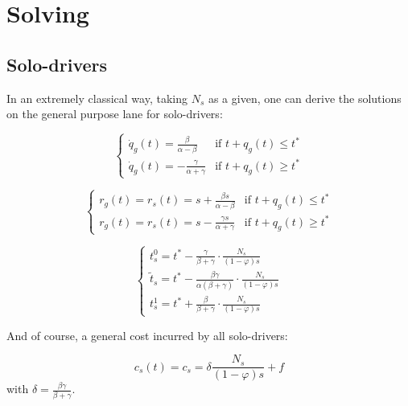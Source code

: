 \documentclass[english, a4paper]{article}
\theoremstyle{plain}
\begin{document}
\section{Solving}

\subsection{Solo-drivers}

In an extremely classical way, taking $N_s$ as a given, one can derive the solutions on the general purpose lane for solo-drivers:


\begin{equation}
    \left\{
    \begin{array}{lr}
        \dot{q}_g(t) = \frac{\beta}{\alpha - \beta} & \text{if } t+q_g(t) \leq t^*\\
        \dot{q}_g(t) = -\frac{\gamma}{\alpha + \gamma} & \text{if } t+q_g(t) \geq t^*  
    \end{array}
    \right.
\end{equation}

\begin{equation}
    \left\{
    \begin{array}{lr}
        r_g (t) = r_s(t) =s + \frac{\beta s}{\alpha - \beta} & \text{if } t+q_g(t) \leq t^*\\
        r_g (t) = r_s(t) =s - \frac{\gamma s}{\alpha + \gamma} & \text{if } t+q_g(t) \geq t^* 
    \end{array}
    \right.
\end{equation}

\begin{equation}
    \left\{
    \begin{array}{l}
        t_s^0 = t^* - \frac{\gamma}{\beta + \gamma} \cdot \frac{N_s}{(1-\varphi)s}\\
        \tilde{t}_s = t^* - \frac{\beta \gamma}{\alpha(\beta + \gamma)}\cdot \frac{N_s}{(1-\varphi)s}\\
        t_s^1 = t^* + \frac{\beta}{\beta + \gamma} \cdot \frac{N_s}{(1-\varphi)s}
    \end{array}
    \right.
\end{equation}

And of course, a general cost incurred by all solo-drivers:

\begin{equation}
    c_s(t) = c_s = \delta \frac{N_s}{(1-\varphi)s} + f
\end{equation}
with $\delta = \frac{\beta \gamma}{\beta + \gamma}$.
\end{document}
